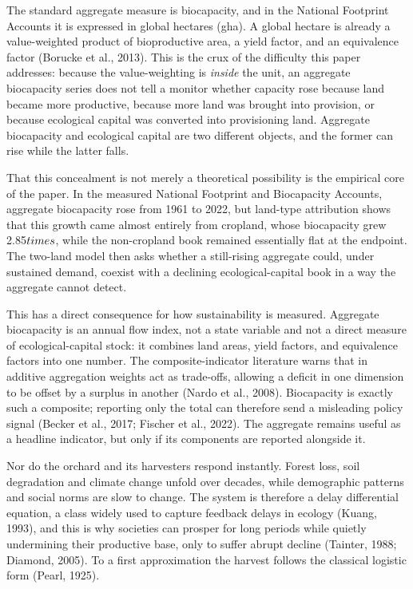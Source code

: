 \documentclass[11pt]{article}
\begin{document}
The standard aggregate measure is biocapacity, and in the National Footprint Accounts it is expressed in global hectares (gha). A global hectare is already a value-weighted product of bioproductive area, a yield factor, and an equivalence factor (Borucke et al., 2013). This is the crux of the difficulty this paper addresses: because the value-weighting is \emph{inside} the unit, an aggregate biocapacity series does not tell a monitor whether capacity rose because land became more productive, because more land was brought into provision, or because ecological capital was converted into provisioning land. Aggregate biocapacity and ecological capital are two different objects, and the former can rise while the latter falls.

That this concealment is not merely a theoretical possibility is the empirical core of the paper. In the measured National Footprint and Biocapacity Accounts, aggregate biocapacity rose from 1961 to 2022, but land-type attribution shows that this growth came almost entirely from cropland, whose biocapacity grew 2.85$\\times$, while the non-cropland book remained essentially flat at the endpoint. The two-land model then asks whether a still-rising aggregate could, under sustained demand, coexist with a declining ecological-capital book in a way the aggregate cannot detect.

This has a direct consequence for how sustainability is measured. Aggregate biocapacity is an annual flow index, not a state variable and not a direct measure of ecological-capital stock: it combines land areas, yield factors, and equivalence factors into one number. The composite-indicator literature warns that in additive aggregation weights act as trade-offs, allowing a deficit in one dimension to be offset by a surplus in another (Nardo et al., 2008). Biocapacity is exactly such a composite; reporting only the total can therefore send a misleading policy signal (Becker et al., 2017; Fischer et al., 2022). The aggregate remains useful as a headline indicator, but only if its components are reported alongside it.

Nor do the orchard and its harvesters respond instantly. Forest loss, soil degradation and climate change unfold over decades, while demographic patterns and social norms are slow to change. The system is therefore a delay differential equation, a class widely used to capture feedback delays in ecology (Kuang, 1993), and this is why societies can prosper for long periods while quietly undermining their productive base, only to suffer abrupt decline (Tainter, 1988; Diamond, 2005). To a first approximation the harvest follows the classical logistic form (Pearl, 1925).
\end{document}
